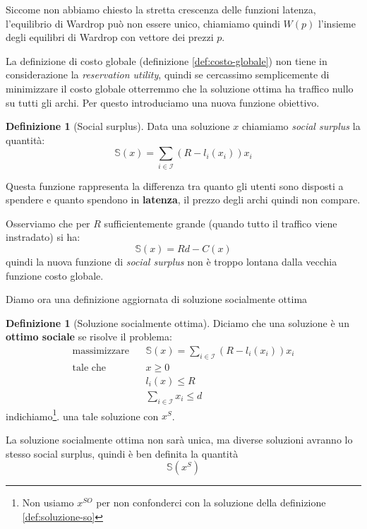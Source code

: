 \documentclass[a4paper]{article}
\theoremstyle{plain}
\theoremstyle{definition}
\newtheorem{mydef}[myteo]{Definizione}
\theoremstyle{remark}
\newcommand{\pa}[1]{\left(#1\right)}
\begin{document}
Siccome non abbiamo chiesto la stretta crescenza delle funzioni
latenza, l'equilibrio di Wardrop può non essere unico, chiamiamo
quindi $W(p)$ l'insieme degli equilibri di Wardrop con vettore
dei prezzi $p$.

La definizione di costo globale (definizione \ref{def:costo-globale})
non tiene in considerazione la \textit{reservation utility}, quindi se
cercassimo semplicemente di minimizzare il costo globale otterremmo
che la soluzione ottima ha traffico nullo su tutti gli archi. Per
questo introduciamo una nuova funzione obiettivo.

\begin{mydef}[Social surplus]
  Data una soluzione $x$ chiamiamo \textit{social surplus} la
  quantità:
  \[ \mathbb{S}(x) = \sum _{i\in\mathcal{I}}\pa{ R -
      l_i\pa{x_i}}x_i \]
\end{mydef}

Questa funzione rappresenta la differenza tra quanto gli utenti sono
disposti a spendere e quanto spendono in \textbf{latenza}, il prezzo
degli archi quindi non compare.

Osserviamo che per $R$ sufficientemente grande (quando tutto il
traffico viene instradato) si ha:
\[ \mathbb{S}(x) = Rd - C(x) \]
quindi la nuova funzione di \textit{social surplus} non è troppo
lontana dalla vecchia funzione costo globale.

Diamo ora una definizione aggiornata di soluzione socialmente ottima
\begin{mydef}[Soluzione socialmente ottima]
  Diciamo che una soluzione è un \textbf{ottimo sociale} se risolve il
  problema:
  \begin{align*}
    \text{massimizzare }\;\; & \mathbb{S}(x) = \sum
                               _{i\in\mathcal{I}}\pa{ R - l_i\pa{x_i}}x_i
    \\
    \text{tale che }\;\; & x\ge 0\\
                             & l_i(x) \le R \\
                             & \sum _{i\in \mathcal{I}} x_i \le d
  \end{align*}
  indichiamo\footnote{Non usiamo $x^{SO}$ per non confonderci con la
    soluzione della definizione \ref{def:soluzione-so}}. una tale
  soluzione con $x^S$.
\end{mydef}

La soluzione socialmente ottima non sarà unica, ma diverse soluzioni
avranno lo stesso social surplus, quindi è ben definita la quantità
\[ \mathbb{S}\pa{x^{S}} \]
\end{document}
